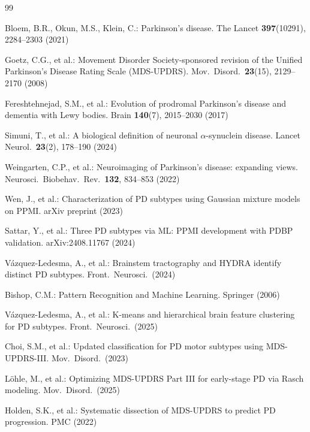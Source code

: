 \documentclass[runningheads]{llncs}
\begin{document}

\begin{thebibliography}{99}

Bloem, B.R., Okun, M.S., Klein, C.: Parkinson's disease. The Lancet \textbf{397}(10291), 2284--2303 (2021)

Goetz, C.G., et al.: Movement Disorder Society-sponsored revision of the Unified Parkinson's Disease Rating Scale (MDS-UPDRS). Mov.\ Disord.\ \textbf{23}(15), 2129--2170 (2008)

Fereshtehnejad, S.M., et al.: Evolution of prodromal Parkinson's disease and dementia with Lewy bodies. Brain \textbf{140}(7), 2015--2030 (2017)

Simuni, T., et al.: A biological definition of neuronal $\alpha$-synuclein disease. Lancet Neurol.\ \textbf{23}(2), 178--190 (2024)

Weingarten, C.P., et al.: Neuroimaging of Parkinson's disease: expanding views. Neurosci.\ Biobehav.\ Rev.\ \textbf{132}, 834--853 (2022)

Wen, J., et al.: Characterization of PD subtypes using Gaussian mixture models on PPMI. arXiv preprint (2023)

Sattar, Y., et al.: Three PD subtypes via ML: PPMI development with PDBP validation. arXiv:2408.11767 (2024)

V\'{a}zquez-Ledesma, A., et al.: Brainstem tractography and HYDRA identify distinct PD subtypes. Front.\ Neurosci.\ (2024)

Bishop, C.M.: Pattern Recognition and Machine Learning. Springer (2006)

V\'{a}zquez-Ledesma, A., et al.: K-means and hierarchical brain feature clustering for PD subtypes. Front.\ Neurosci.\ (2025)

Choi, S.M., et al.: Updated classification for PD motor subtypes using MDS-UPDRS-III. Mov.\ Disord.\ (2023)

L\"{o}hle, M., et al.: Optimizing MDS-UPDRS Part III for early-stage PD via Rasch modeling. Mov.\ Disord.\ (2025)

Holden, S.K., et al.: Systematic dissection of MDS-UPDRS to predict PD progression. PMC (2022)


\end{thebibliography}
\end{document}
